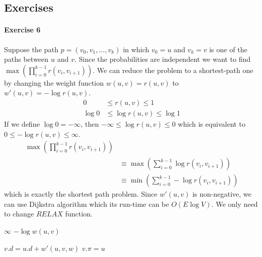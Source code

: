 \documentclass{book}
\begin{document}
	\subsection{Exercises}
	\paragraph{Exercise 6}
	Suppose the path $p = (v_0, v_1, \dots, v_k)$ in which $v_0 = u$ and $v_k = v$ is one of the paths between $u$ and $v$. Since the probabilities are independent we want to find $\max(\prod_{i = 0}^{k - 1}r(v_i, v_{i+1}))$. We can reduce the problem to a shortest-path one by changing the weight function $w(u, v) = r(u, v)$ to $w'(u, v) = -\log{r(u, v)}$.
	\begin{equation*}
	\begin{split}
		0 &\le r(u, v) \le 1 \\
		\log 0 &\le \log{r(u, v)} \le \log 1
	\end{split}
	\end{equation*}
	If we define $\log 0 = -\infty$, then $-\infty \le \log{r(u, v)} \le 0$ which is equivalent to $0 \le -\log{r(u, v)} \le \infty$.
	\begin{equation*}
	\begin{split}
		\max(\prod_{i = 0}^{k - 1}r(v_i, v_{i+1})) \\
		&\equiv \max(\sum_{i = 0}^{k - 1}\log{r(v_i, v_{i+1})}) \\
		&\equiv \min(\sum_{i = 0}^{k - 1}-\log{r(v_i, v_{i+1})})
	\end{split}
	\end{equation*}
	which is exactly the shortest path problem. Since $w'(u, v)$ is non-negative, we can use Dijkstra algorithm which its run-time can be $O(E\log V)$. We only need to change $RELAX$ function.
	\begin{algorithm*}[h!]
		\begin{algorithmic}[1]
					\State \Return $\infty$
				\Else
					\State \Return $-\log{w(u, v)}$
				\EndIf
			\EndFunction
		\end{algorithmic}
	\end{algorithm*}
	\begin{algorithm*}
		\begin{algorithmic}[1]
					\State $v.d = u.d + w'(u, v, w)$
					\State $v.\pi = u$
				\EndIf
			\EndFunction
		\end{algorithmic}
	\end{algorithm*}	
	\FloatBarrier
	
\end{document}
